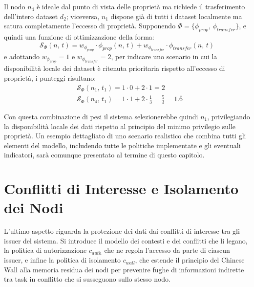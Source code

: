 Il nodo $n_4$ è ideale dal punto di vista delle proprietà ma richiede il trasferimento dell'intero dataset $d_2$; viceversa, $n_1$ dispone già di tutti i dataset localmente ma satura completamente l'eccesso di proprietà. Supponendo $\Phi = \{\phi_{prop},\, \phi_{transfer}\}$, e quindi una funzione di ottimizzazione della forma:
\begin{equation}
    \mathcal{S}_\Phi(n,\, t) = w_{\phi_{prop}} \cdot \phi_{prop}(n,\, t) + w_{\phi_{transfer}} \cdot \phi_{transfer}(n,\, t)
\end{equation}
e adottando $w_{\phi_{prop}} = 1$ e $w_{\phi_{transfer}} = 2$, per indicare uno scenario in cui la disponibilità locale dei dataset è ritenuta prioritaria rispetto all'eccesso di proprietà, i punteggi risultano:
\begin{align}
    &\mathcal{S}_\Phi(n_1,\, t_1) = 1 \cdot 0 + 2 \cdot 1 = 2 \\[1ex]
    &\mathcal{S}_\Phi(n_4,\, t_1) = 1 \cdot 1 + 2 \cdot \frac{1}{3} = \frac{5}{3} = 1.\overline{6}
\end{align}

Con questa combinazione di pesi il sistema selezionerebbe quindi $n_1$, privilegiando la disponibilità locale dei dati rispetto al principio del minimo privilegio sulle proprietà. Un esempio dettagliato di uno scenario realistico che combina tutti gli elementi del modello, includendo tutte le politiche implementate e gli eventuali indicatori, sarà comunque presentato al termine di questo capitolo.


\section{Conflitti di Interesse e Isolamento dei Nodi}
\label{sec:conflitti_isolamento}

L'ultimo aspetto riguarda la protezione dei dati dai conflitti di interesse tra gli issuer del sistema. Si introduce il modello dei contesti e dei conflitti che li legano, la politica di autorizzazione $c_{auth}$ che ne regola l'accesso da parte di ciascun issuer, e infine la politica di isolamento $c_{wall}$, che estende il principio del Chinese Wall alla memoria residua dei nodi per prevenire fughe di informazioni indirette tra task in conflitto che si susseguono sullo stesso nodo.



